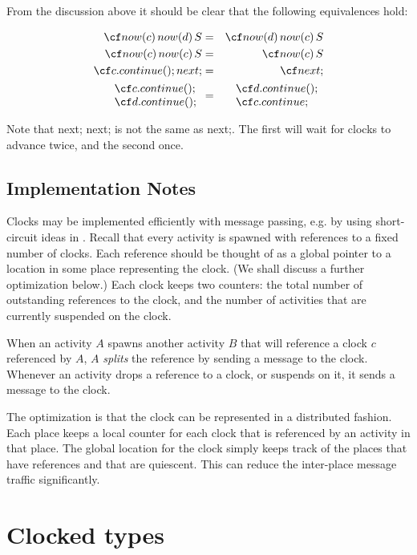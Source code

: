 From the discussion above it should be clear that the following
equivalences hold:

\begin{eqnarray}
 {\cf now(c)\, now(d)\,S} &=& {\cf now(d)\, now(c)\,S}\\
 {\cf now(c)\, now(c)\,S} &=& {\cf now(c)\,S}\\
 {\cf c.continue();  next;} &=& {\cf next;}\\
\begin{array}{l}
 {\cf c.continue();}\\
 {\cf d.continue();}
\end{array}  &=& 
\begin{array}{l}
{\cf d.continue();}\\
{\cf c.continue;}
\end{array}
\end{eqnarray}

Note that {\cf next; next;} is not the same as {\cf next;}. The
first will wait for clocks to advance twice, and the second
once.  

\subsection{Implementation Notes}
Clocks may be implemented efficiently with message passing, e.g.{} by
using short-circuit ideas in \cite{SaraswatPODC88}.  Recall that every
activity is spawned with references to a fixed number of clocks. Each
reference should be thought of as a global pointer to a location in
some place representing the clock. (We shall discuss a further
optimization below.) Each clock keeps two counters: the total number
of outstanding references to the clock, and the number of activities
that are currently suspended on the clock.

When an activity $A$ spawns another activity $B$ that will reference a
clock $c$ referenced by $A$, $A$ {\em splits} the reference by sending
a message to the clock. Whenever an activity drops a reference to a
clock, or suspends on it, it sends a message to the clock. 

The optimization is that the clock can be represented in a distributed
fashion. Each place keeps a local counter for each clock that is
referenced by an activity in that place. The global location for the
clock simply keeps track of the places that have references and that
are quiescent. This can reduce the inter-place message traffic
significantly.


\section{Clocked types}

